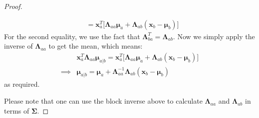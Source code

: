 \begin{proof}
\begin{enumerate}
\begin{equation*}
\begin{aligned}
            &= \boldsymbol x_a^T\Big[ \boldsymbol \Lambda_{aa}\boldsymbol \mu_a + \boldsymbol \Lambda_{ab}(\boldsymbol x_b - \boldsymbol \mu_b) \Big]
        \end{aligned}
        \end{equation*}
        For the second equality, we use the fact that $\boldsymbol \Lambda_{ba}^T = \boldsymbol \Lambda_{ab}$. Now we simply apply the inverse of $\boldsymbol \Lambda_{aa}$ to get the mean, which means:
        \begin{equation*}
        \begin{aligned}
            &\boldsymbol x_a^T\boldsymbol \Lambda_{aa}\boldsymbol \mu_{a|b} = \boldsymbol x_a^T\Big[ \boldsymbol \Lambda_{aa}\boldsymbol \mu_a + \boldsymbol \Lambda_{ab}(\boldsymbol x_b - \boldsymbol \mu_b) \Big]\\
            \implies&\boldsymbol \mu_{a|b} = \boldsymbol \mu_a + \boldsymbol \Lambda_{aa}^{-1}\boldsymbol \Lambda_{ab}(\boldsymbol x_b-\boldsymbol \mu_b)
        \end{aligned}
        \end{equation*}
        as required. 
    \end{enumerate}
    Please note that one can use the block inverse above to calculate $\boldsymbol \Lambda_{aa}$ and $\boldsymbol \Lambda_{ab}$ in terms of $\boldsymbol \Sigma$.
\end{proof}

